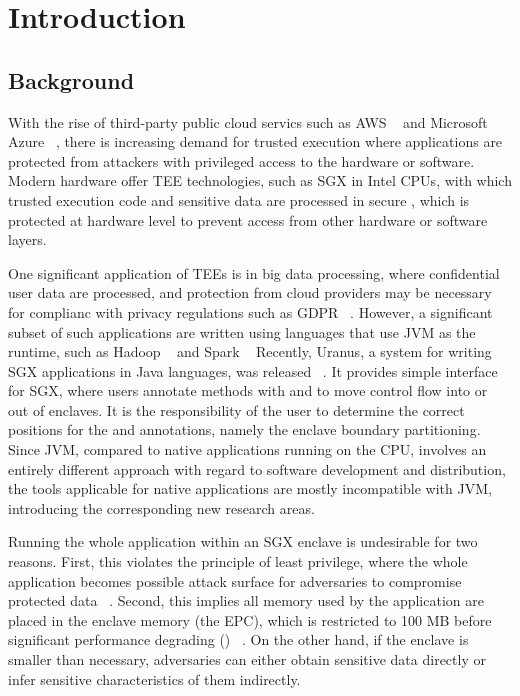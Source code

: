 \section{Introduction}\label{sec:introduction}

\subsection{Background}\label{subsec:background}
With the rise of third-party public cloud servics
such as AWS ~\cite{aws} and Microsoft Azure ~\cite{azure},
there is increasing demand for trusted execution where
applications are protected from
attackers with privileged access to the hardware or software.
Modern hardware offer TEE technologies,
such as SGX in Intel CPUs,
with which trusted execution code and sensitive data
are processed in secure ,
which is protected at hardware level to prevent access
from other hardware or software layers.

One significant application of TEEs is in big data processing,
where confidential user data are processed,
and protection from cloud providers may be necessary
for complianc with privacy regulations such as GDPR ~\cite{gdpr}.
However, a significant subset of such applications are written
using languages that use JVM as the runtime,
such as Hadoop ~\cite{apachehadoop} and Spark ~\cite{apachespark}
Recently, Uranus, a system for
writing SGX applications in Java languages, was released ~\cite{uranus}.
It provides simple interface for SGX,
where users annotate methods with  and 
to move control flow into or out of enclaves.
It is the responsibility of the user to determine the correct positions
for the  and  annotations,
namely the enclave boundary partitioning.
Since JVM, compared to native applications running on the CPU,
involves an entirely different approach
with regard to software development and distribution,
the tools applicable for native applications are mostly incompatible with JVM,
introducing the corresponding new research areas.

Running the whole application within an SGX enclave is undesirable for two reasons.
First, this violates the principle of least privilege,
where the whole application becomes possible attack surface
for adversaries to compromise protected data ~\cite{glamdring}.
Second, this implies all memory used by the application
are placed in the enclave memory (the EPC),
which is restricted to 100 MB before significant performance degrading
() ~\cite{uranus}.
On the other hand, if the enclave is smaller than necessary,
adversaries can either obtain sensitive data directly or
infer sensitive characteristics of them indirectly.

